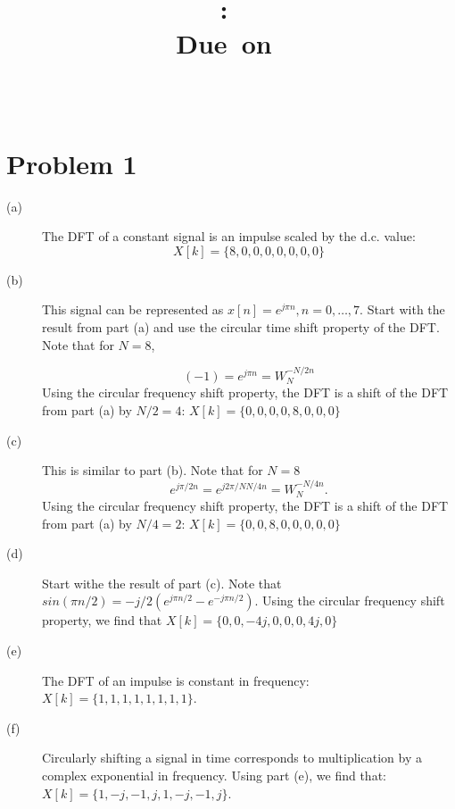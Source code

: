 \documentclass{article}
\title{
\vspace{2in}
\textmd{\textbf{\hmwkClass:\ \hmwkTitle}}\\
\normalsize\vspace{0.1in}\small{Due\ on\ \hmwkDueDate}\\
\vspace{0.1in}\large{\textit{\hmwkClassInstructor\ \hmwkClassTime}}
\vspace{3in}
}
\author{\textbf{\hmwkAuthorName}}
\date{} %
\begin{document}
	
\section{Problem 1}

\begin{description}
	\item[(a)] The DFT of a constant signal is an impulse scaled by the d.c. value: 
	\begin{equation}
		X[k] = \{8, 0, 0, 0, 0, 0, 0, 0\}
	\end{equation}
	
	\item[(b)] This signal can be represented as  $x[n] = e^{j\pi n}, n = 0, \ldots, 7$. Start with the result from part (a) and use the circular time shift property of the DFT. Note that for $N = 8$, 
	
	\begin{equation}
	(-1) = e^{j\pi n} = W_N^{-N/2n}
	\end{equation}
	Using the circular frequency shift property, the DFT is a shift of the DFT from part (a) by $N/2 = 4$: $X[k] = \{0, 0, 0, 0, 8, 0, 0, 0\}$
	
	\item[(c)] This is similar to part (b). Note that for $N = 8$
	\begin{equation}
	e^{j\pi/2n} = e^{j2\pi/N N/4n} = W_N^{-N/4n}.
	\end{equation}
	Using the circular frequency shift property, the DFT is a shift of the DFT from part (a) by $N/4 = 2$: $X[k] = \{0, 0, 8, 0, 0, 0, 0, 0\}$
	
	\item[(d)] Start withe the result of part (c). Note that $sin(\pi n/2) = -j/2(e^{j\pi n/2} - e^{-j\pi n/2})$. Using the circular frequency shift property, we find that $X[k] = \{0, 0, -4j, 0, 0, 0, 4j, 0\}$
	
	\item[(e)] The DFT of an impulse is constant in frequency: $X[k] = \{1, 1, 1, 1, 1, 1, 1, 1\}$.
	
	\item[(f)] Circularly shifting a signal in time corresponds to multiplication by a complex exponential in frequency. Using part (e), we find that: $X[k] = \{1, -j, -1, j, 1, -j, -1, j\}$.  
\end{description}
\end{document}

